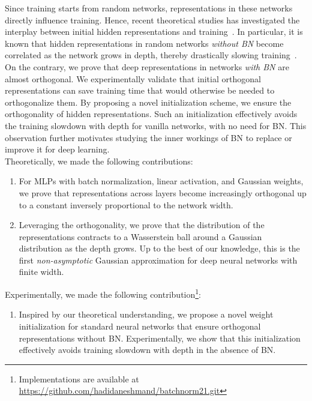 Since training starts from random networks,  representations in these networks directly influence training. Hence, recent  theoretical studies has investigated the interplay between initial hidden representations and training~\citep{daneshmand2020batch,bjorck2018understanding,frankle2020training,schoenholz2016deep,saxe2013exact,bahri2020statistical}.
In particular, it is known that hidden representations in random networks \emph{without BN} become correlated as the network grows in depth, thereby drastically slowing training~\citep{daneshmand2020batch,he2016deep,bjorck2018understanding,saxe2013exact}. 
On the contrary,  we prove that deep representations in networks \emph{with BN} are almost orthogonal.
We experimentally validate that initial orthogonal representations can save training time that would otherwise be needed to orthogonalize them. By proposing a novel initialization scheme, we ensure the orthogonality of hidden representations. Such an initialization effectively avoids the training slowdown with depth for vanilla networks, with no need for BN.  This observation further motivates studying the inner workings of BN to replace or improve it for deep learning. \\
Theoretically, we made the following contributions:
\begin{enumerate}
    \item  For MLPs with batch normalization, linear activation, and Gaussian weights, we prove that representations across layers become increasingly orthogonal up to a constant inversely proportional to the network width. 
    \item Leveraging the orthogonality, we prove that the distribution of the representations contracts to a Wasserstein ball around a Gaussian distribution as the depth grows. Up to the best of our knowledge,  this is the first \textit{non-asymptotic} Gaussian approximation for deep neural networks with finite width.
\end{enumerate}
Experimentally, we made the following contribution\footnote{Implementations are available at \href{https://github.com/hadidaneshmand/batchnorm21.git}{https://github.com/hadidaneshmand/batchnorm21.git}}: 
\begin{enumerate}[resume]
    \item  Inspired by our theoretical understanding, we propose a novel weight initialization for standard neural networks that ensure orthogonal representations without BN. Experimentally, we show that this initialization effectively avoids training slowdown with depth in the absence of BN. 
\end{enumerate}






